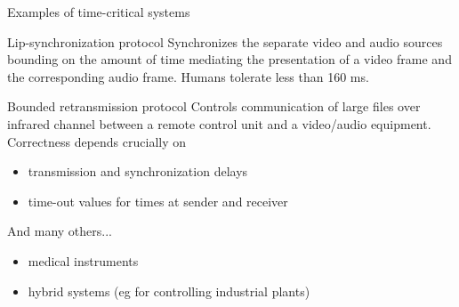 \documentclass[aspectratio=169]{beamer}
\begin{document}
\begin{slide}{Examples of time-critical systems}
\small
\begin{block}{Lip-synchronization protocol}
Synchronizes the separate video and audio sources bounding on
the amount of time mediating the presentation of a video frame and the corresponding audio frame. Humans tolerate
 less than 160 ms.
\end{block}

\begin{block}{Bounded retransmission  protocol}
Controls communication of large files over infrared channel between a remote control unit and a 
video/audio equipment. Correctness depends crucially on 
\\[-2mm]
\begin{itemize}
\item transmission and synchronization delays
\item time-out values for times at sender and receiver
\end{itemize}
\end{block}

\begin{block}{And many others...}
\begin{itemize}
\item medical instruments
\item hybrid systems (eg for controlling industrial plants)
\end{itemize}
\end{block}
\end{slide}


\end{document}
